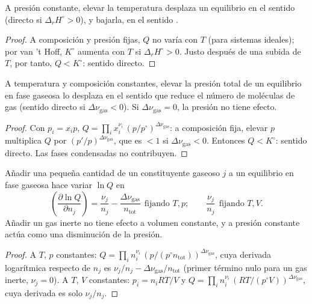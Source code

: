 \begin{proposition}[Temperatura]\label{prop:b2:equilibrium-shifts:temperature}
A presión constante, elevar la temperatura desplaza un equilibrio en el
sentido  (directo si $\Delta_r H^\circ > 0$), y bajarla, en el
sentido .
\end{proposition}

\begin{proof}
A composición y presión fijas, $Q$ no varía con $T$ (para sistemas
ideales); por van 't Hoff, $K^\circ$ aumenta con $T$ si $\Delta_r H^\circ >
0$. Justo después de una subida de $T$, por tanto, $Q < K^\circ$: sentido directo.
\end{proof}

\begin{proposition}[Presión]\label{prop:b2:equilibrium-shifts:pressure}
A temperatura y composición constantes, elevar la presión total de un
equilibrio en fase gaseosa lo desplaza en el sentido que reduce el número de
moléculas de gas (sentido directo si $\Delta\nu_{\text{gas}} < 0$). Si $\Delta\nu_{\text{gas}}
= 0$, la presión no tiene efecto.
\end{proposition}

\begin{proof}
Con $p_i = x_ip$, $Q = \prod_i x_i^{\nu_i}\,(p/p^\circ)^{\Delta\nu_{\text{gas}}}$:
a composición fija, elevar $p$ multiplica $Q$ por
$(p'/p)^{\Delta\nu_{\text{gas}}}$, que es $< 1$ si $\Delta\nu_{\text{gas}} <
0$. Entonces $Q < K^\circ$: sentido directo. Las fases condensadas no contribuyen.
\end{proof}

\begin{proposition}\label{prop:b2:equilibrium-shifts:adding}
Añadir una pequeña cantidad de un constituyente gaseoso $j$ a un equilibrio en fase gaseosa
hace variar $\ln Q$ en
\[
  \left(\frac{\partial\ln Q}{\partial n_j}\right) = \frac{\nu_j}{n_j} -
  \frac{\Delta\nu_{\text{gas}}}{n_{\text{tot}}}\ \ \text{fijando } T, p ;
  \qquad \frac{\nu_j}{n_j}\ \ \text{fijando } T, V .
\]
Añadir un gas inerte no tiene efecto a volumen constante, y a presión constante
actúa como una disminución de la presión.
\end{proposition}

\begin{proof}
A $T$, $p$ constantes: $Q = \prod_i n_i^{\nu_i}\,(p/(p^\circ n_{\text{tot}}))^{
\Delta\nu_{\text{gas}}}$, cuya derivada logarítmica respecto de $n_j$ es
$\nu_j/n_j - \Delta\nu_{\text{gas}}/n_{\text{tot}}$ (primer término nulo para un gas
inerte, $\nu_j = 0$). A $T$, $V$ constantes: $p_i = n_iRT/V$ y $Q = \prod_i n_i^{
\nu_i}\,(RT/(p^\circ V))^{\Delta\nu_{\text{gas}}}$, cuya derivada es
solo $\nu_j/n_j$.
\end{proof}

